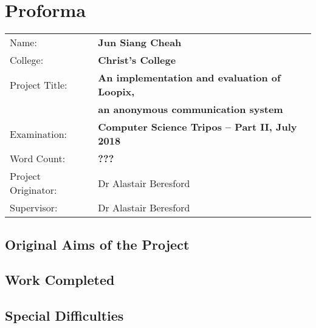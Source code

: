 \documentclass[final,dissertation.tex]{subfiles}
\begin{document}
\pagestyle{plain}

\chapter*{Proforma}

{\large
	\begin{tabular}{ll}
		Name:               & \bf Jun Siang Cheah                               \\
		College:            & \bf Christ's College                              \\
		Project Title:      & \bf An implementation and evaluation of Loopix,   \\ 
		& \bf an anonymous communication system             \\
		Examination:        & \bf Computer Science Tripos -- Part II, July 2018 \\
		Word Count:         & \bf ???                                           \\
		Project Originator: & Dr Alastair Beresford                             \\
		Supervisor:         & Dr Alastair Beresford                             \\ 
	\end{tabular}
}


\section*{Original Aims of the Project}


\section*{Work Completed}


\section*{Special Difficulties}
\end{document}
